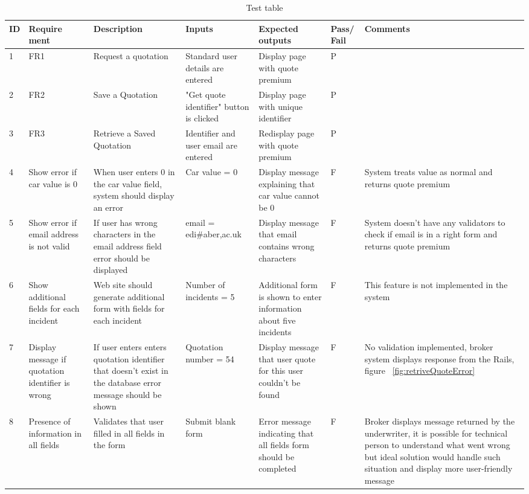 \documentclass[10pt,a4paper,headinclude=true,twoside]{report}
\begin{document}
\begin{center}
\begin{table}
 
\begin{tabularx}{\textwidth} { |p{0.14cm}|p{0.88cm}|X|X|X|p{0.6cm}|X|}
   \hline                        
  ID &  Require ment & Description &  Inputs  &  Expected outputs & Pass/ Fail & Comments  \\ \hline
   1 & FR1 &  Request a quotation & Standard user details are entered &  Display page with quote premium & P &  \\ \hline
   2 & FR2 & Save a Quotation & "Get quote identifier" button is clicked &  Display page with unique identifier & P &  \\ \hline
   3 & FR3 & Retrieve a Saved Quotation & Identifier and user email are entered &  Redisplay page with quote premium & P & \\ \hline
   4 & Show error if car value is 0 & When user enters 0 in the car value field, system should display an error &  Car value = 0 &  Display message explaining that car value cannot be 0 & F & System treats value as normal and returns quote premium\\ \hline
   5 & Show error if email address is not valid & If user has wrong characters in the email address field error should be displayed& email = edi\#aber,ac.uk &  Display message that email contains wrong characters & F & System doesn't have any validators to check if email is in a right form and returns quote premium\\ \hline
   6 & Show additional fields for each incident & Web site should generate additional form with fields for each incident& Number of incidents = 5  &  Additional form is shown to enter information about five incidents & F & This feature is not implemented in the system\\ \hline
   7 & Display message if quotation identifier is wrong&  If user enters enters quotation identifier that doesn't exist in the database error message should be shown  &Quotation number = 54  &  Display message that user quote for this user couldn't be found & F & No validation implemented, broker system displays response from the Rails, figure ~\ref{fig:retriveQuoteError}\\ \hline
   8 & Presence of information in all fields &  Validates that user filled in all fields in the form &  Submit blank form & Error message indicating that all fields form should be completed & F & Broker displays message returned by the underwriter, it is possible for technical person to understand what went wrong but ideal solution would handle such situation and display more user-friendly message \\ \hline
   
   
   \hline  
   
\end{tabularx}
\caption{Test table}
\label{fig:testing}
\end{table}
\end{center}
\end{document}
